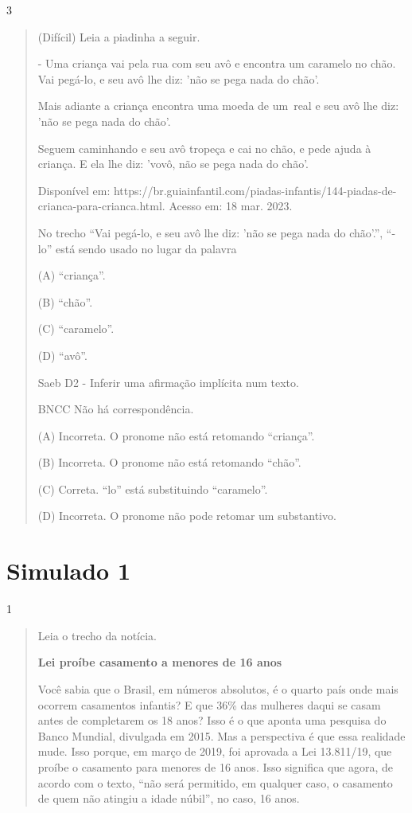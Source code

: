 \begin{escolha}
\begin{escolha}
{\num{3}

\begin{quote}
(Difícil) Leia a piadinha a seguir.

- Uma criança vai pela rua com seu avô e encontra um caramelo no chão.
Vai pegá-lo, e seu avô lhe diz: 'não se pega nada do chão'.

Mais adiante a criança encontra uma moeda de um~real e seu avô lhe diz:
'não se pega nada do chão'.~

Seguem caminhando e seu avô tropeça e cai no chão, e pede ajuda à
criança. E ela lhe diz: 'vovô, não se pega nada do chão'.

Disponível em:
https://br.guiainfantil.com/piadas-infantis/144-piadas-de-crianca-para-crianca.html.
Acesso em: 18 mar. 2023.

No trecho ``Vai pegá-lo, e seu avô lhe diz: 'não se pega nada do
chão'.'', ``-lo'' está sendo usado no lugar da palavra

(A) ``criança''.

(B) ``chão''.

(C) ``caramelo''.

(D) ``avô''.

Saeb D2 - Inferir uma afirmação implícita num texto.

BNCC Não há correspondência.

(A) Incorreta. O pronome não está retomando ``criança''.

(B) Incorreta. O pronome não está retomando ``chão''.

(C) Correta. ``lo'' está substituindo ``caramelo''.

(D) Incorreta. O pronome não pode retomar um substantivo.
\end{quote}

\chapter{Simulado 1}

\num{1}

\begin{quote}
Leia o trecho da notícia.

\textbf{Lei proíbe casamento a menores de 16 anos}

Você sabia que o Brasil, em números absolutos, é o quarto país onde mais
ocorrem casamentos infantis? E que 36\% das mulheres daqui se casam
antes de completarem os 18 anos? Isso é o que aponta uma pesquisa do
Banco Mundial, divulgada em 2015. Mas a perspectiva é que essa realidade
mude. Isso porque, em março de 2019, foi aprovada a Lei 13.811/19, que
proíbe o casamento para menores de 16 anos. Isso significa que agora, de
acordo com o texto, ``não será permitido, em qualquer caso, o casamento
de quem não atingiu a idade núbil'', no caso, 16 anos.


\end{quote}}
\end{escolha}
\end{escolha}
